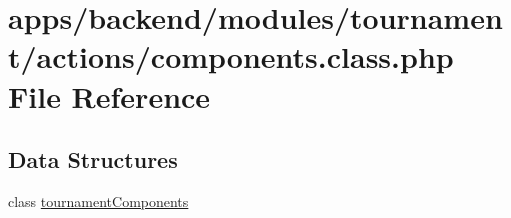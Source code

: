 \hypertarget{backend_2modules_2tournament_2actions_2components_8class_8php}{\section{apps/backend/modules/tournament/actions/components.class.\-php File Reference}
\label{backend_2modules_2tournament_2actions_2components_8class_8php}
}
\subsection*{Data Structures}
\begin{DoxyCompactItemize}
\item 
class \hyperlink{classtournament_components}{tournament\-Components}
\end{DoxyCompactItemize}
